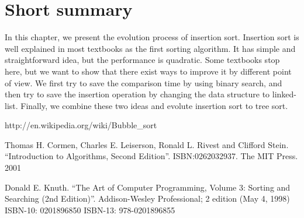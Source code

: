 \documentclass[b5paper]{article}
\begin{document}
\section{Short summary}
In this chapter, we present the evolution process of insertion sort. Insertion
sort is well explained in most textbooks as the first sorting algorithm.
It has simple and straightforward idea, but the performance is quadratic.
Some textbooks stop here, but we want to show that there exist ways to improve
it by different point of view. We first try to save the comparison time
by using binary search, and then try to save the insertion operation by
changing the data structure to linked-list. Finally, we combine these
two ideas and evolute insertion sort to tree sort.

\begin{thebibliography}{99}

http://en.wikipedia.org/wiki/Bubble\_sort

Thomas H. Cormen, Charles E. Leiserson, Ronald L. Rivest and Clifford Stein.
``Introduction to Algorithms, Second Edition''. ISBN:0262032937. The MIT Press. 2001

Donald E. Knuth. ``The Art of Computer Programming, Volume 3: Sorting and Searching (2nd Edition)''. Addison-Wesley Professional; 2 edition (May 4, 1998) ISBN-10: 0201896850 ISBN-13: 978-0201896855

\end{thebibliography}

\ifx\wholebook\relax\else
\end{document}
